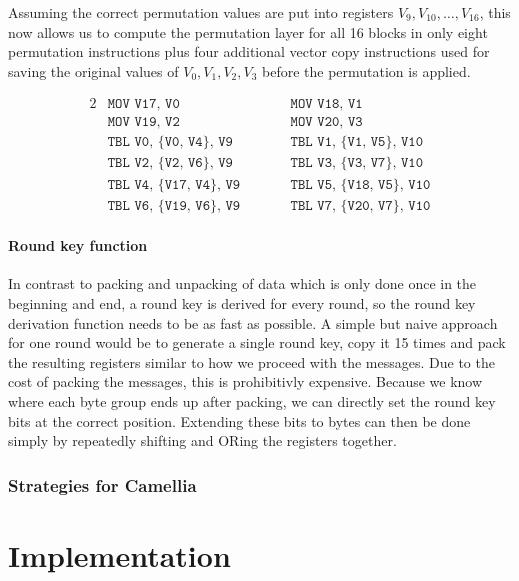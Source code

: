 \documentclass[12pt]{report}
\begin{document}
Assuming the correct permutation values are put into registers
$V_9,V_{10},\dots,V_{16}$, this now allows us to compute the permutation layer for
all 16 blocks in only eight permutation instructions plus four additional vector
copy instructions used for saving the original values of $V_0,V_1,V_2,V_3$
before the permutation is applied.

\begin{alignat*}{2}
    &\texttt{MOV V17, V0}\qquad &&\texttt{MOV V18, V1} \\
    &\texttt{MOV V19, V2}\qquad &&\texttt{MOV V20, V3} \\
    &\texttt{TBL V0, \{V0, V4\}, V9}\qquad &&\texttt{TBL V1, \{V1, V5\}, V10} \\
    &\texttt{TBL V2, \{V2, V6\}, V9}\qquad &&\texttt{TBL V3, \{V3, V7\}, V10} \\
    &\texttt{TBL V4, \{V17, V4\}, V9}\qquad &&\texttt{TBL V5, \{V18, V5\}, V10} \\
    &\texttt{TBL V6, \{V19, V6\}, V9}\qquad &&\texttt{TBL V7, \{V20, V7\}, V10}
\end{alignat*}

\subsubsection{Round key function}

In contrast to packing and unpacking of data which is only done once in the
beginning and end, a round key is derived for every round, so the round key
derivation function needs to be as fast as possible. A simple but naive
approach for one round would be to generate a single round key, copy it 15
times and pack the resulting registers similar to how we proceed with the
messages. Due to the cost of packing the messages, this is prohibitivly
expensive. Because we know where each byte group ends up after packing, we can
directly set the round key bits at the correct position. Extending these bits
to bytes can then be done simply by repeatedly shifting and ORing the registers
together.

\subsection{Strategies for Camellia}

\chapter{Implementation}
\end{document}
